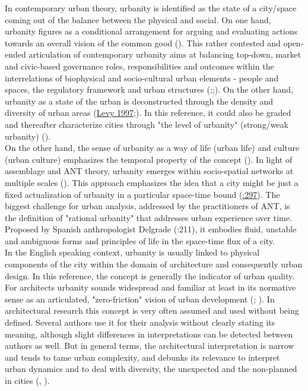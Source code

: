 \documentclass[11pt]{report}
\begin{document}
{{{In contemporary urban theory, urbanity is identified as the state of a city/space coming out of the balance  between the physical and social. On one hand, urbanity figures  as a conditional arrangement for arguing and evaluating actions towards an overall vision of the common good (\href{Holden}{\citealt{holden_justifying_2015}}).
This rather contested and open-ended articulation of contemporary urbanity aims at balancing top-down, market and civic-based governance roles, responsibilities and outcomes within the interrelations of biophysical and socio-cultural urban elements - people and spaces, the regulatory framework and urban structures (\href{Groth}{\citealt{groth_reclaiming_2005}};\href{Tardin}{\citealt{tardin_landscape_2014}};\href{Holden}{\citealt{holden_justifying_2015}}).
On the other hand, urbanity as a state of the urban is deconstructed through the density and diversity of urban areas (\href{Levy}{Levy 1997};\href{Levy}{\citealt{levy_liens_2013}}). In this reference, it could also be graded and thereafter characterize cities through  "the level of urbanity" (strong/weak urbanity) (\citealt{levy_liens_2013}).
\\

On the other hand, the sense of urbanity as a way of life (urban life) and culture (urban culture) emphasizes the temporal property of the concept (\href{Farias}{\citealt{farias_introduction:_2011}}).
In light of assemblage and ANT theory, urbanity emerges within socio-spatial networks at multiple scales (\href{Kamalipour}{\citealt{kamalipour_assemblage_2015}}).
This approach emphasizes the idea that a city might be just a fixed actualization of urbanity in a particular space-time bound (\href{Farias}{\citealt{farias_introduction:_2011}:297}).
The biggest challenge for urban analysis, addressed by the practitioners of ANT, is the definition of "rational urbanity" that addresses urban experience over time.
Proposed by Spanish anthropologist Delgrade (\citealt{(Farias and Bender 2011)}:211), it embodies fluid, unstable and ambiguous forms and principles of life in the space-time flux of a city.
\\

In the English speaking context, urbanity is usually linked to physical components of the city within the domain of architecture and consequently urban design.
In this reference, the concept is generally the indicator of urban quality. For architects urbanity sounds widespread and familiar at least in its normative sense as an articulated, "zero-friction" vision of urban development (\href{ref}{\citealt{Hajer 1999}}; \href{wust}{\cite{wust_urbanity_2005}}).
In architectural research this concept is very often assumed and used without being defined.
Several authors use it for their analysis without clearly stating its meaning, although slight differences in interpretations can be detected between authors as well.
But in general terms, the architectural interpretation is narrow and tends to tame urban complexity, and debunks its relevance to interpret urban dynamics  and to deal with diversity, the unexpected and the non-planned in cities (\href{Groth}{\citealt{groth_reclaiming_2005}}, \href{Wuest}{\citealt{wust_urbanity_2005}}). 
\\

}}}
\end{document}
